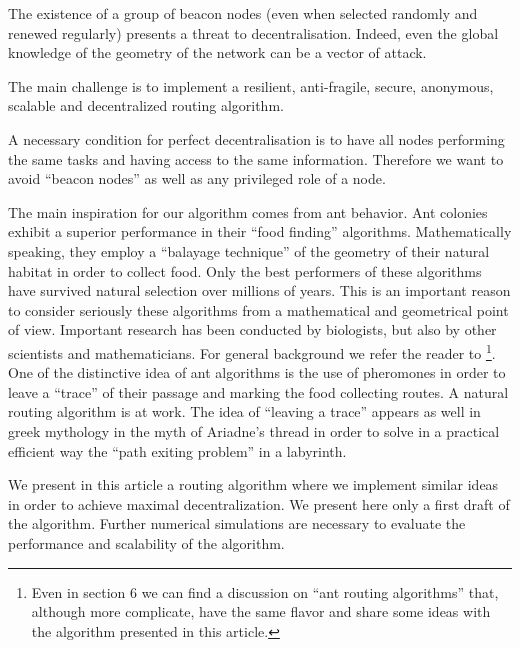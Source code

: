 \documentclass[12pt]{amsart}
\theoremstyle{remark}
\begin{document}

The existence of a group of beacon nodes (even when selected randomly and renewed regularly) presents a threat 
to decentralisation. Indeed, even the global knowledge of the geometry of the network can be a vector of attack.


The main challenge is to implement a resilient, anti-fragile, secure, anonymous, scalable 
and decentralized routing algorithm. 


A necessary condition for perfect decentralisation is to have all nodes performing the same tasks and having access 
to the same information. Therefore we want to avoid ``beacon nodes'' as well as any privileged role of a node.


The main inspiration for our algorithm comes from ant behavior. 
Ant colonies exhibit a superior performance in their ``food finding'' algorithms. 
Mathematically speaking, they employ a ``balayage technique'' of the geometry of their natural habitat
in order to collect food. Only the best performers of these algorithms have survived 
natural selection over millions of years. This is an important reason 
to consider seriously these algorithms from a mathematical and geometrical point of view. 
Important research has been conducted by biologists, but also by other scientists and  
mathematicians. For general background we refer the reader to \cite{DS04}\footnote{Even in section 6 we can find 
a discussion on ``ant routing algorithms'' that, although more complicate, have the same flavor and share some  
ideas with the algorithm  presented in this article.}. 
One of the distinctive idea of ant algorithms is the 
use of pheromones in order to leave a ``trace'' of their passage and marking the food collecting routes. 
A natural routing algorithm is at work. The idea of ``leaving a trace'' appears 
as well in greek mythology in the myth of Ariadne's thread in order to solve in a practical efficient way
the ``path exiting problem'' in a labyrinth. 


We present in this article a routing algorithm where we implement similar ideas in order to achieve 
maximal decentralization. We present here only a first draft of the algorithm.
Further numerical 
simulations are necessary to evaluate the performance and scalability of the algorithm.

\end{document}
